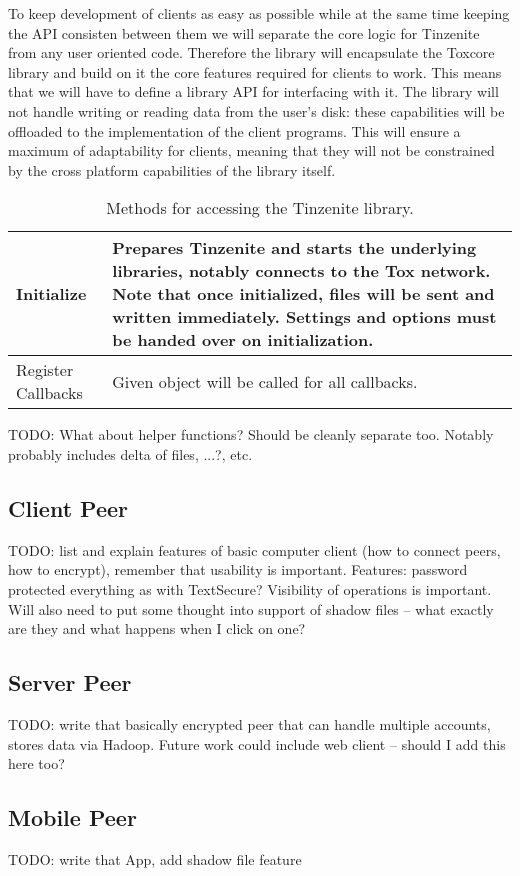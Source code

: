 To keep development of clients as easy as possible while at the same time keeping the API consisten between them we will separate the core logic for Tinzenite from any user oriented code.
Therefore the library will encapsulate the Toxcore library and build on it the core features required for clients to work.
This means that we will have to define a library API for interfacing with it.
The library will not handle writing or reading data from the user's disk: these capabilities will be offloaded to the implementation of the client programs.
This will ensure a maximum of adaptability for clients, meaning that they will not be constrained by the cross platform capabilities of the library itself.

\begin{table}[H]
\centering
\begin{tabulary}{\textwidth}{p{2.5cm} || J}
	Initialize & Prepares Tinzenite and starts the underlying libraries, notably connects to the Tox network. Note that once initialized, files will be sent and written immediately. Settings and options must be handed over on initialization.\\
	\hline
    Register Callbacks & Given object will be called for all callbacks.\\
\end{tabulary}
\caption[Tinzenite Library API]{Methods for accessing the Tinzenite library.}
\label{table:lib:api}
\end{table}

TODO: What about helper functions?
Should be cleanly separate too.
Notably probably includes delta of files, ...?, etc.

\subsection{Client Peer}

TODO: list and explain features of basic computer client (how to connect peers, how to encrypt), remember that usability is important.
Features: password protected everything as with TextSecure?
Visibility of operations is important.
Will also need to put some thought into support of shadow files – what exactly are they and what happens when I click on one?

\subsection{Server Peer}

TODO: write that basically encrypted peer that can handle multiple accounts, stores data via Hadoop.
Future work could include web client – should I add this here too?

\subsection{Mobile Peer}

TODO: write that App, add shadow file feature
